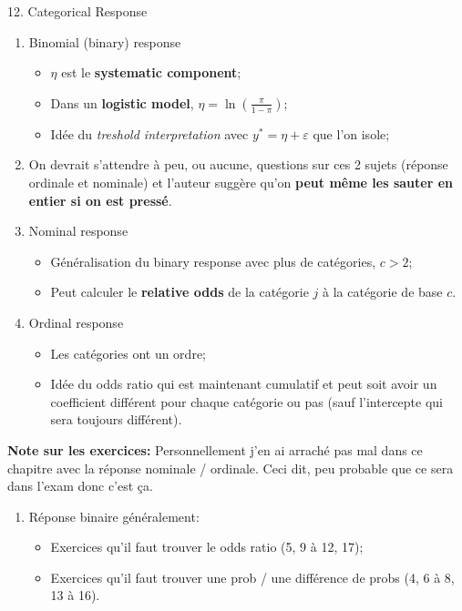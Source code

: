 \documentclass[12pt, titlepage, french]{report}
\begin{document}
\begin{CHPT_SUMM}{12. Categorical Response}
\begin{enumerate}
	\item	Binomial (binary) response
	\begin{itemize}
		\item	$\eta$ est le \textbf{systematic component};
		\item	Dans un \textbf{logistic model}, $\eta = \ln\left( \frac{\pi}{1 - \pi} \right)$;
		\item	Idée du \textit{treshold interpretation} avec $y^{*} = \eta + \varepsilon$ que l'on isole;
	\end{itemize}
	\item[]	On devrait s'attendre à peu, ou aucune, questions sur ces 2 sujets (réponse ordinale et nominale) et l'auteur suggère qu'on \textbf{peut même les sauter en entier si on est pressé}.
	\item	Nominal response	
	\begin{itemize}
		\item	Généralisation du binary response avec plus de catégories, $c > 2$;
		\item	Peut calculer le \textbf{relative odds} de la catégorie $j$ à la catégorie de base $c$.
	\end{itemize}
	\item	Ordinal response
	\begin{itemize}
		\item	Les catégories ont un ordre;
		\item	Idée du odds ratio qui est maintenant cumulatif et peut soit avoir un coefficient différent pour chaque catégorie ou pas (sauf l'intercepte qui sera toujours différent).
	\end{itemize}
\end{enumerate}
\textbf{Note sur les exercices:} Personnellement j'en ai arraché pas mal dans ce chapitre avec la réponse nominale / ordinale. Ceci dit, peu probable que ce sera dans l'exam donc c'est ça.
\begin{enumerate}
	\item	Réponse binaire généralement:
	\begin{itemize}
		\item	Exercices qu'il faut trouver le odds ratio (5, 9 à 12, 17);
		\item	Exercices qu'il faut trouver une prob / une différence de probs (4, 6 à 8, 13 à 16).
	\end{itemize}

\end{enumerate}
\end{CHPT_SUMM}
\end{document}
